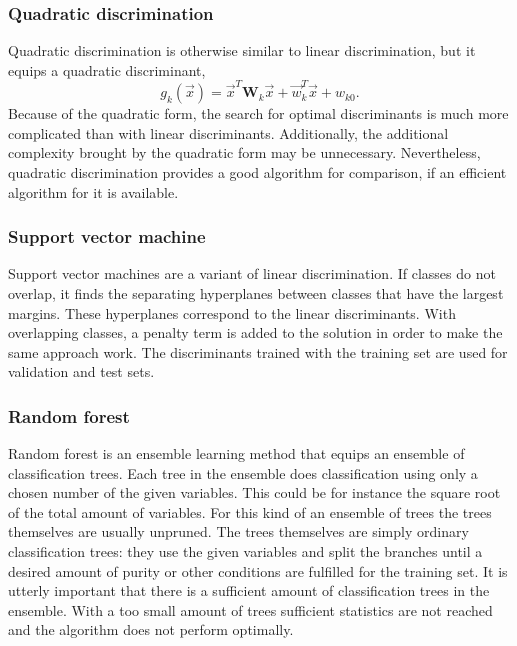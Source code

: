 \documentclass[twoside]{article}
\renewcommand{\v}[1]{\vec{#1}}
\begin{document}
\begin{multicols}{2}
\subsubsection{Quadratic discrimination}\label{method:qdiskr}

Quadratic discrimination is otherwise similar to linear discrimination, but it equips a quadratic discriminant,
\begin{equation}
 g_k(\v{x}) = \v{x}^T \mathbf{W}_k \v{x} + \v{w}_k^T \v{x} + w_{k0}.
\end{equation}
Because of the quadratic form, the search for optimal discriminants is much more complicated than with linear
discriminants. Additionally, the additional complexity brought by the quadratic form may be unnecessary.
Nevertheless, quadratic discrimination provides a good algorithm for comparison, if an efficient algorithm
for it is available.

\subsubsection{Support vector machine}\label{method:svm}

Support vector machines are a variant of linear discrimination. If classes do not overlap, it finds
the separating hyperplanes between classes that have the largest margins. These hyperplanes correspond 
to the linear discriminants. With overlapping classes, a penalty term is added to the solution in order
to make the same approach work. The discriminants trained with the training set are used for validation
and test sets.

\subsubsection{Random forest}\label{method:randfor}

Random forest \cite{Forest} is an ensemble learning method that equips an ensemble of classification trees. Each tree 
in the ensemble does classification using only a chosen number of the given variables. This could be for
instance the square root of the total amount of variables. For this kind of an ensemble of trees
the trees themselves are usually unpruned. The trees themselves are simply ordinary classification trees:
they use the given variables and split the branches until a desired amount of purity or other conditions
are fulfilled for the training set. It is utterly important that there is a sufficient amount of classification
trees in the ensemble. With a too small amount of trees sufficient statistics are not reached and the algorithm
does not perform optimally.


\end{multicols}
\end{document}
